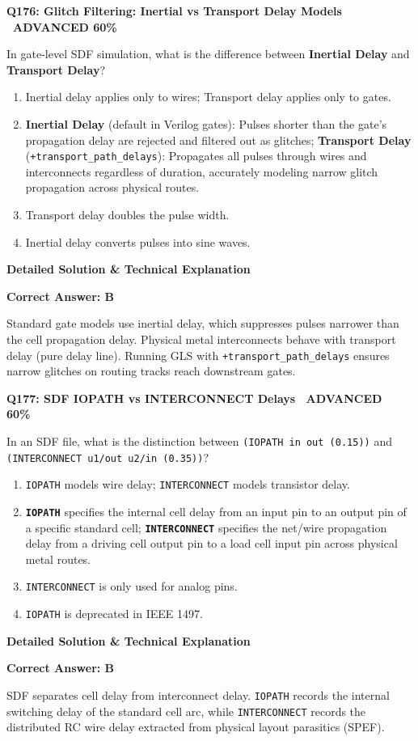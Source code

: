 \documentclass[11pt,a4paper]{article}
\newcommand{\badgeadv}{{\color{white}\colorbox{advred}{\bfseries\sffamily\tiny\ ADVANCED 60\%\ }}}
\newenvironment{qbox}[2]{%
  \begin{mdframed}[style=qstyle]%
  {\bfseries\sffamily\color{primaryblue}#1 \hfill #2}\par\vspace{2pt}%
}{%
  \end{mdframed}%
}
\newenvironment{ansbox}{%
  \begin{mdframed}[style=ansstyle]%
  {\bfseries\sffamily\color{ansgreen}\small Detailed Solution \& Technical Explanation}\par\vspace{2pt}\small%
}{%
  \end{mdframed}%
}
\begin{document}
\begin{qbox}{Q176: Glitch Filtering: Inertial vs Transport Delay Models}{\badgeadv}
In gate-level SDF simulation, what is the difference between \textbf{Inertial Delay} and \textbf{Transport Delay}?
\begin{enumerate}[label=\textbf{\Alph*.}]
  \item Inertial delay applies only to wires; Transport delay applies only to gates.
  \item \textbf{Inertial Delay} (default in Verilog gates): Pulses shorter than the gate's propagation delay are rejected and filtered out as glitches; \textbf{Transport Delay} (\texttt{+transport\_path\_delays}): Propagates all pulses through wires and interconnects regardless of duration, accurately modeling narrow glitch propagation across physical routes.
  \item Transport delay doubles the pulse width.
  \item Inertial delay converts pulses into sine waves.
\end{enumerate}
\end{qbox}
\begin{ansbox}
\textbf{Correct Answer: B}

Standard gate models use inertial delay, which suppresses pulses narrower than the cell propagation delay. Physical metal interconnects behave with transport delay (pure delay line). Running GLS with \texttt{+transport\_path\_delays} ensures narrow glitches on routing tracks reach downstream gates.
\end{ansbox}

\begin{qbox}{Q177: SDF IOPATH vs INTERCONNECT Delays}{\badgeadv}
In an SDF file, what is the distinction between \texttt{(IOPATH in out (0.15))} and \texttt{(INTERCONNECT u1/out u2/in (0.35))}?
\begin{enumerate}[label=\textbf{\Alph*.}]
  \item \texttt{IOPATH} models wire delay; \texttt{INTERCONNECT} models transistor delay.
  \item \textbf{\texttt{IOPATH}} specifies the internal cell delay from an input pin to an output pin of a specific standard cell; \textbf{\texttt{INTERCONNECT}} specifies the net/wire propagation delay from a driving cell output pin to a load cell input pin across physical metal routes.
  \item \texttt{INTERCONNECT} is only used for analog pins.
  \item \texttt{IOPATH} is deprecated in IEEE 1497.
\end{enumerate}
\end{qbox}
\begin{ansbox}
\textbf{Correct Answer: B}

SDF separates cell delay from interconnect delay. \texttt{IOPATH} records the internal switching delay of the standard cell arc, while \texttt{INTERCONNECT} records the distributed RC wire delay extracted from physical layout parasitics (SPEF).
\end{ansbox}
\end{document}
